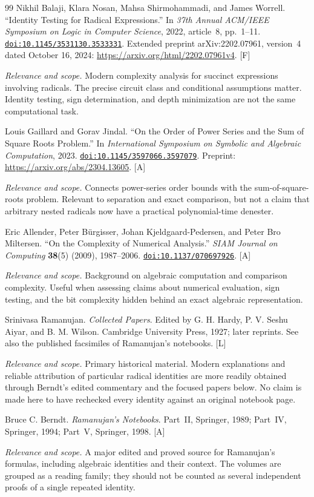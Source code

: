 \documentclass[11pt,letterpaper]{article}
\numberwithin{equation}{section}
\theoremstyle{definition}
\theoremstyle{remark}
\newcommand{\doi}[1]{\href{https://doi.org/#1}{\nolinkurl{doi:#1}}}
\newcommand{\status}[1]{\textsf{\small[#1]}}
\newcommand{\entrynote}[1]{\par\smallskip\noindent\emph{Relevance and scope.} #1}
\begin{document}
\begin{thebibliography}{99}
Nikhil Balaji, Klara Nosan, Mahsa Shirmohammadi, and James Worrell. ``Identity Testing for Radical Expressions.'' In \emph{37th Annual ACM/IEEE Symposium on Logic in Computer Science}, 2022, article~8, pp.~1--11. \doi{10.1145/3531130.3533331}. Extended preprint arXiv:2202.07961, version~4 dated October 16, 2024: \url{https://arxiv.org/html/2202.07961v4}. \status{F}
\entrynote{Modern complexity analysis for succinct expressions involving radicals. The precise circuit class and conditional assumptions matter. Identity testing, sign determination, and depth minimization are not the same computational task.}

Louis Gaillard and Gorav Jindal. ``On the Order of Power Series and the Sum of Square Roots Problem.'' In \emph{International Symposium on Symbolic and Algebraic Computation}, 2023. \doi{10.1145/3597066.3597079}. Preprint: \url{https://arxiv.org/abs/2304.13605}. \status{A}
\entrynote{Connects power-series order bounds with the sum-of-square-roots problem. Relevant to separation and exact comparison, but not a claim that arbitrary nested radicals now have a practical polynomial-time denester.}

Eric Allender, Peter B\"urgisser, Johan Kjeldgaard-Pedersen, and Peter Bro Miltersen. ``On the Complexity of Numerical Analysis.'' \emph{SIAM Journal on Computing} \textbf{38}(5) (2009), 1987--2006. \doi{10.1137/070697926}. \status{A}
\entrynote{Background on algebraic computation and comparison complexity. Useful when assessing claims about numerical evaluation, sign testing, and the bit complexity hidden behind an exact algebraic representation.}

Srinivasa Ramanujan. \emph{Collected Papers}. Edited by G. H. Hardy, P. V. Seshu Aiyar, and B. M. Wilson. Cambridge University Press, 1927; later reprints. See also the published facsimiles of Ramanujan's notebooks. \status{L}
\entrynote{Primary historical material. Modern explanations and reliable attribution of particular radical identities are more readily obtained through Berndt's edited commentary and the focused papers below. No claim is made here to have rechecked every identity against an original notebook page.}

Bruce C. Berndt. \emph{Ramanujan's Notebooks}. Part~II, Springer, 1989; Part~IV, Springer, 1994; Part~V, Springer, 1998. \status{A}
\entrynote{A major edited and proved source for Ramanujan's formulas, including algebraic identities and their context. The volumes are grouped as a reading family; they should not be counted as several independent proofs of a single repeated identity.}


\end{thebibliography}
\end{document}
